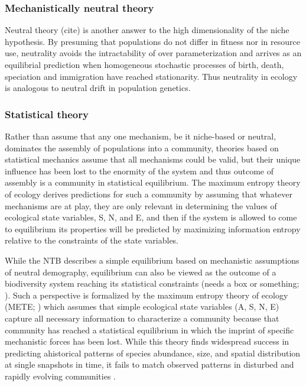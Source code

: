 \documentclass[12pt]{article}
\begin{document}
\subsubsection{Mechanistically neutral theory}

Neutral theory (cite) is another answer to the high dimensionality of
the niche hypothesis. By presuming that populations do not differ in
fitness nor in resource use, neutrality avoids the intractability of
over parameterization and arrives as an equilibrial prediction when
homogeneous stochastic processes of birth, death, speciation and
immigration have reached stationarity. Thus neutrality in ecology is
analogous to neutral drift in population genetics.

\subsubsection{Statistical theory}

Rather than assume that any one mechanism, be it niche-based or neutral,
dominates the assembly of populations into a community, theories based
on statistical mechanics assume that all mechanisms could be valid, but
their unique influence has been lost to the enormity of the system and
thus outcome of assembly is a community in statistical equilibrium. The
maximum entropy theory of ecology derives predictions for such a
community by assuming that whatever mechanisms are at play, they are
only relevant in determining the values of ecological state variables,
S, N, and E, and then if the system is allowed to come to equilibrium
its properties will be predicted by maximizing information entropy
relative to the constraints of the state variables.

While the NTB describes a simple equilibrium based on mechanistic
assumptions of neutral demography, equilibrium can also be viewed as
the outcome of a biodiversity system reaching its statistical
constraints (needs a box or something; \cite{Harte2011-um,
  Shipley2006-sx, Pueyo2007-iq,Bowler2012-tn}).  Such a perspective is
formalized by the maximum entropy theory of ecology (METE;
\cite{Harte2011-um}) which assumes that simple ecological state
variables (A, S, N, E) capture all necessary information to
characterize a community because that community has reached a
statistical equilibrium in which the imprint of specific mechanistic
forces has been lost. While this theory finds widespread success in
predicting ahistorical patterns of species abundance, size, and
spatial distribution \cite{Harte2011-um, White2012-yw, Xiao2015-jv,
  Harte2009-zq} at single snapshots in time, it fails to match
observed patterns in disturbed and rapidly evolving communities
\cite{Rominger2015-kb,Harte2011-um}.
\end{document}
